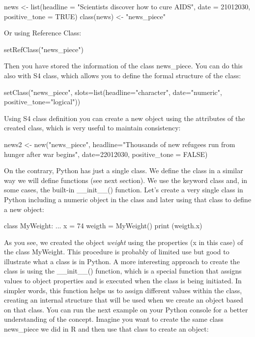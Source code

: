 \begin{exampler}
news <- list(headline = "Scientists discover how to cure AIDS", date = 21012030, positive_tone = TRUE)
class(news) <- "news_piece"
\end{exampler}

Or using Reference Class:

\begin{exampler}
setRefClass("news_piece")
\end{exampler}

Then you have stored the information of the class news\_piece.  You can do this also with S4 class, which allows you to define the formal structure of the class:

\begin{exampler}
setClass("news_piece", slots=list(headline="character", date="numeric", positive_tone="logical"))
\end{exampler}

Using S4 class definition you can create a new object using the attributes of the created class, which is very useful to maintain consistency:

\begin{exampler}
news2 <- new("news_piece", headline="Thousands of new refugees run from hunger after war begins", date=22012030, positive_tone = FALSE)
\end{exampler}

On the contrary, Python has just a single class. We define the class in a similar way we will define functions (see next section). We use the keyword class and, in some cases, the built-in \_\_init\_\_() function.  Let's create a very single class in Python including a numeric object in the class and later using that class to define a new object:

\begin{examplepy}
class MyWeight:
...    	 x = 74
weigth = MyWeight()
print (weigth.x)
\end{examplepy}

As you see, we created the object \emph{weight} using the properties (x in this case) of the class MyWeight. This procedure is probably of limited use but good to illustrate what a class is in Python. A more interesting approach to create the class is using the \_\_init\_\_() function, which is a special function that assigns values to object properties and is executed when the class is being initiated. In simpler words, this function helps us to assign different values within the class, creating an internal structure that will be used when we create an object based on that class. You can run the next example on your Python console for a better understanding of the concept. Imagine you want to create the same class news\_piece we did in R and then use that class to create an object:

